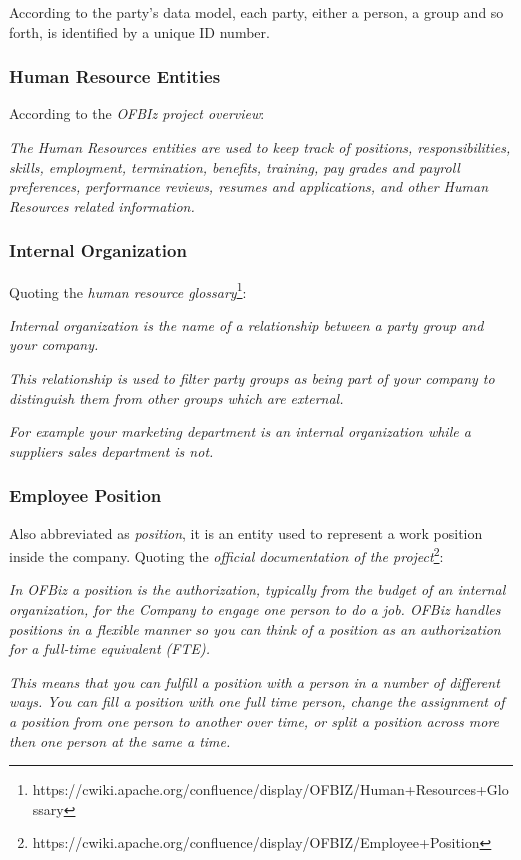 According to the party's data model, each party, either a person, a group and so forth, is identified by a unique ID number.

\subsubsection{Human Resource Entities}

According to the \textit{OFBIz project overview}:

\textit{The Human Resources entities are used to keep track of positions, responsibilities, skills, employment, termination, benefits, training, pay grades and payroll preferences, performance reviews, resumes and applications, and other Human Resources related information.}

\subsubsection{Internal Organization}
Quoting the \textit{human resource glossary}\footnote{https://cwiki.apache.org/confluence/display/OFBIZ/Human+Resources+Glossary}:

\textit{Internal organization is the name of a relationship between a party group and your company.}

\textit{This relationship is used to filter party groups as being part of your company to distinguish them from other groups which are external.}

\textit{For example your marketing department is an internal organization while a suppliers sales department is not.}

\subsubsection{Employee Position}

Also abbreviated as \textit{position}, it is an entity used to represent a work position inside the company.
Quoting the \textit{official documentation of the project}\footnote{https://cwiki.apache.org/confluence/display/OFBIZ/Employee+Position}:

\textit{In OFBiz a position is the authorization, typically from the budget of an internal organization, for the Company to engage one person to do a job. OFBiz handles positions in a flexible manner so you can think of a position as an authorization for a full-time equivalent (FTE).}

\textit{This means that you can fulfill a position with a person in a number of different ways. You can fill a position with one full time person, change the assignment of a position from one person to another over time, or split a position across more then one person at the same a time.}

